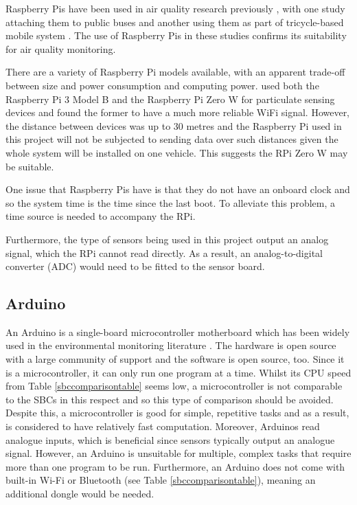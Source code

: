 \documentclass[11pt]{report}
\begin{document}
Raspberry Pis have been used in air quality research previously \citep{ibrahim2015IOTenvmon,Balasubramaniyan2016AQMS_RPi,Rahman2017adaptivesensingRPi,thorpe2017RPimesh,alkandari2018airqualityexperimental}, with one study attaching them to public buses \citep{2014busairqualityVSN} and another using them as part of tricycle-based mobile system \citep{Jabbar2017bikefossarchitecture}. The use of Raspberry Pis in these studies confirms its suitability for air quality monitoring.

There are a variety of Raspberry Pi models available, with an apparent trade-off between size and power consumption and computing power. \cite{thorpe2017RPimesh} used both the Raspberry Pi 3 Model B and the Raspberry Pi Zero W for particulate sensing devices and found the former to have a much more reliable WiFi signal. However, the distance between devices was up to 30 metres and the Raspberry Pi used in this project will not be subjected to sending data over such distances given the whole system will be installed on one vehicle. This suggests the RPi Zero W may be suitable.
   
One issue that Raspberry Pis have is that they do not have an onboard clock and so the system time is the time since the last boot. To alleviate this problem, a time source is needed to accompany the RPi.

Furthermore, the type of sensors being used in this project output an analog signal, which the RPi cannot read directly. As a result, an analog-to-digital converter (ADC) would need to be fitted to the sensor board.

\subsection{Arduino}

An Arduino is a single-board microcontroller motherboard which has been widely used in the environmental monitoring literature \citep{2014busairqualityVSN,Devarakonda2013,Balasubramaniyan2016AQMS_RPi,sun2016HKmarathonML,Ferdoush2014rasppiandarduino,Lee2014arduinorestful,Alvear2016ecosensor,Fuertes2016realtime,Piedrahita2014quantexposuremtrng,Abraham2014costeffindoor}. The hardware is open source with a large community of support and the software is open source, too. Since it is a microcontroller, it can only run one program at a time. Whilst its CPU speed from Table \ref{sbccomparisontable} seems low, a microcontroller is not comparable to the SBCs in this respect and so this type of comparison should be avoided. Despite this, a microcontroller is good for simple, repetitive tasks and as a result, is considered to have relatively fast computation. Moreover, Arduinos read analogue inputs, which is beneficial since sensors typically output an analogue signal. However, an Arduino is unsuitable for multiple, complex tasks that require more than one program to be run. Furthermore, an Arduino does not come with built-in Wi-Fi or Bluetooth (see Table \ref{sbccomparisontable}), meaning an additional dongle would be needed.
\end{document}
